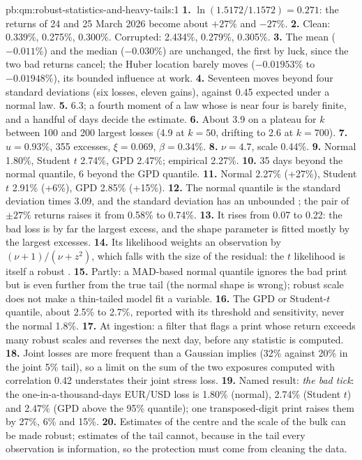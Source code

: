 \begin{solution}{pb:qm:robust-statistics-and-heavy-tails:1}
\textbf{1.} $\ln(1.5172/1.1572) = 0.271$: the returns of 24 and 25 March 2026 become about $+27\%$ and $-27\%$.
\textbf{2.} Clean: 0.339\%, 0.275\%, 0.300\%. Corrupted: 2.434\%, 0.279\%, 0.305\%.
\textbf{3.} The mean ($-0.011\%$) and the median ($-0.030\%$) are unchanged, the first by luck, since the two bad returns cancel; the Huber
location barely moves ($-0.01953\%$ to $-0.01948\%$), its bounded influence at work.
\textbf{4.} Seventeen moves beyond four standard deviations (six losses, eleven gains), against 0.45 expected under a normal law.
\textbf{5.} 6.3; a fourth moment of a law whose  is near four is barely finite, and a handful of days decide the estimate.
\textbf{6.} About 3.9 on a plateau for $k$ between 100 and 200 largest losses (4.9 at $k = 50$, drifting to 2.6 at $k = 700$).
\textbf{7.} $u = 0.93\%$, 355 excesses, $\xi = 0.069$, $\beta = 0.34\%$.
\textbf{8.} $\nu = 4.7$, scale 0.44\%.
\textbf{9.} Normal 1.80\%, Student $t$ 2.74\%, GPD 2.47\%; empirical 2.27\%.
\textbf{10.} 35 days beyond the normal quantile, 6 beyond the GPD quantile.
\textbf{11.} Normal 2.27\% (+27\%), Student $t$ 2.91\% (+6\%), GPD 2.85\% (+15\%).
\textbf{12.} The normal quantile is the standard deviation times 3.09, and the standard deviation has an unbounded ; the pair
of $\pm 27\%$ returns raises it from 0.58\% to 0.74\%.
\textbf{13.} It rises from 0.07 to 0.22: the bad loss is by far the largest excess, and the shape parameter is fitted mostly by the largest
excesses.
\textbf{14.} Its likelihood weights an observation by $(\nu + 1)/(\nu + z^2)$, which falls with the size of the residual: the $t$ likelihood is itself a
robust .
\textbf{15.} Partly: a MAD-based normal quantile ignores the bad print but is even further from the true tail (the normal shape is wrong); robust
scale does not make a thin-tailed model fit a  variable.
\textbf{16.} The GPD or Student-$t$ quantile, about 2.5\% to 2.7\%, reported with its threshold and sensitivity, never the normal 1.8\%.
\textbf{17.} At ingestion: a filter that flags a print whose return exceeds many robust scales and reverses the next day, before any statistic
is computed.
\textbf{18.} Joint losses are more frequent than a Gaussian  implies (32\% against 20\% in the joint 5\% tail), so a limit on the sum of the
two exposures computed with correlation 0.42 understates their joint stress loss.
\textbf{19.} Named result: \emph{the bad tick}: the one-in-a-thousand-days EUR/USD loss is 1.80\% (normal), 2.74\% (Student $t$) and 2.47\%
(GPD above the 95\% quantile); one transposed-digit print raises them by 27\%, 6\% and 15\%.
\textbf{20.} Estimates of the centre and the scale of the bulk can be made robust; estimates of the tail cannot, because in the tail every
observation is information, so the protection must come from cleaning the data.
\end{solution}

